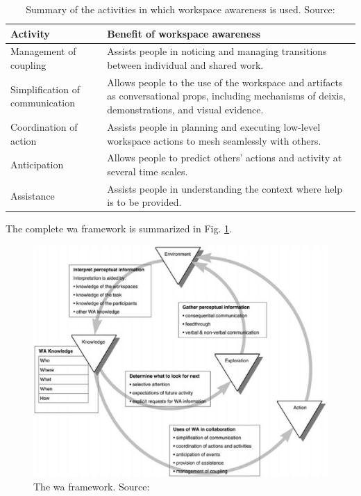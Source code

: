 \begin{table}[]
	\caption{Summary of the activities in which workspace awareness is used. Source: \parencite{gutwin_descriptive_2002}}
	\label{tab:summaryofactivitieswherwacanbeused}
	
	\begin{tabularx}{\linewidth}{lX}
		\hline
		Activity                        & Benefit of workspace awareness                                                                                                                        \\ \hline
		Management of coupling          & Assists people in noticing and managing transitions between individual and shared work.                                                               \\
		Simplification of communication & Allows people to the use of the workspace and artifacts as conversational props, including mechanisms of deixis, demonstrations, and visual evidence. \\
		Coordination of action          & Assists people in planning and executing low-level workspace actions to mesh seamlessly with others.                                                  \\
		Anticipation                    & Allows people to predict others’ actions and activity at several time scales.                                                                         \\
		Assistance                      & Assists people in understanding the context where help is to be provided.                                                                             \\ \hline
	\end{tabularx}
\end{table}


The complete \gls{wa} framework is summarized in Fig. \ref{fig:waframework}.

\begin{figure}
	\centering
	\includegraphics[width=0.8\linewidth]{figures/wa_framework}
	\caption{The \gls{wa} framework. Source: \parencite{gutwin_descriptive_2002}}
	\label{fig:waframework}
\end{figure}


